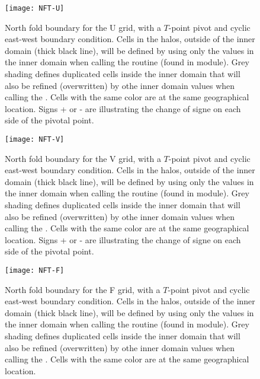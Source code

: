 \documentclass[../main/NEMO_manual]{subfiles}
\begin{document}
\begin{figure}[t]
  \centering
  \texttt{[image: NFT-U]}
  \caption{
    North fold boundary for the U grid, with a $T$-point pivot and cyclic east-west boundary condition.
    Cells in the halos, outside of the inner domain (thick black line), will be defined by using only the values in the inner domain when calling the  routine (found in  module). Grey shading defines duplicated cells inside the inner domain that will also be refined (overwritten) by othe inner domain values when calling the .
    Cells with the same color are at the same geographical location. Signs + or - are illustrating the change of signe on each side of the pivotal point.}
  \label{fig:NFT-U}
\end{figure}

\begin{figure}[t]
  \centering
  \texttt{[image: NFT-V]}
  \caption{
    North fold boundary for the V grid, with a $T$-point pivot and cyclic east-west boundary condition.
    Cells in the halos, outside of the inner domain (thick black line), will be defined by using only the values in the inner domain when calling the  routine (found in  module). Grey shading defines duplicated cells inside the inner domain that will also be refined (overwritten) by othe inner domain values when calling the .
    Cells with the same color are at the same geographical location. Signs + or - are illustrating the change of signe on each side of the pivotal point.}
  \label{fig:NFT-V}
\end{figure}

\begin{figure}[t]
  \centering
  \texttt{[image: NFT-F]}
  \caption{
    North fold boundary for the F grid, with a $T$-point pivot and cyclic east-west boundary condition.
    Cells in the halos, outside of the inner domain (thick black line), will be defined by using only the values in the inner domain when calling the  routine (found in  module). Grey shading defines duplicated cells inside the inner domain that will also be refined (overwritten) by othe inner domain values when calling the .
    Cells with the same color are at the same geographical location.}
  \label{fig:NFT-F}
\end{figure}

\clearpage

\end{document}
